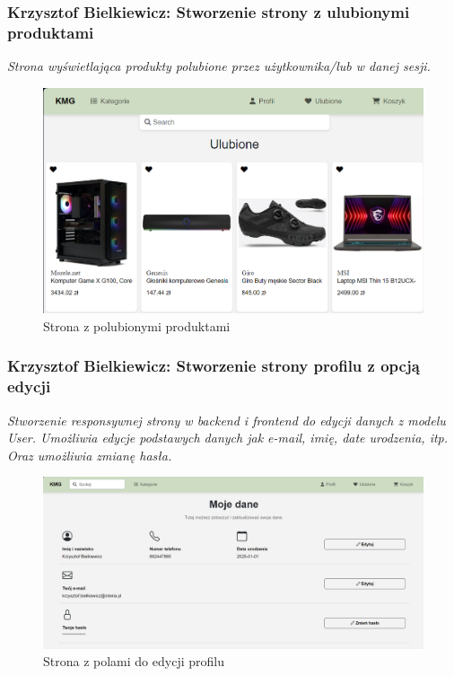 \documentclass[12pt,a4paper,oneside]{article}
\theoremstyle{definition}
\numberwithin{equation}{section}
\begin{document}
\subsubsection{Krzysztof Bielkiewicz: Stworzenie strony z ulubionymi produktami}
\label{1.3.5}
\textit{Strona wyświetlająca produkty polubione przez użytkownika/lub w danej sesji.}

\begin{figure}[H]
    \centering
    \includegraphics[width=0.8\columnwidth]{images/krzysztofBImages/strona-ulubione.png}
    \caption{Strona z polubionymi produktami}
    \label{strona-ulubione}
\end{figure}

\subsubsection{Krzysztof Bielkiewicz: Stworzenie strony profilu z opcją edycji}
\label{1.3.6}
\textit{Stworzenie responsywnej strony w backend i frontend do edycji danych z modelu User.
Umożliwia edycje podstawych danych jak e-mail, imię, date urodzenia, itp.
Oraz umożliwia zmianę hasła.}

\begin{figure}[H]
    \centering
    \includegraphics[width=0.9\columnwidth]{images/krzysztofBImages/profil/strona-edycji-profilu.png}
    \caption{Strona z polami do edycji profilu}
    \label{strona-edycji-profilu}
\end{figure}
\end{document}
